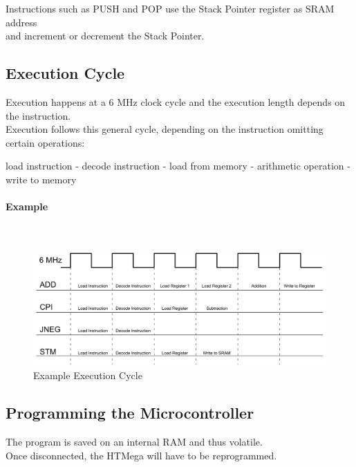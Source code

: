 Instructions such as PUSH and POP use the Stack Pointer register as SRAM address\\
and increment or decrement the Stack Pointer. \newpage


\subsection{Execution Cycle}
Execution happens at a 6 MHz clock cycle and the execution length depends on the instruction.\\
Execution follows this general cycle, depending on the instruction omitting certain operations:
\begin{center}\begin{mdframed}[backgroundcolor=light-gray, roundcorner=10pt,leftmargin=1, rightmargin=1, innerleftmargin=13, innertopmargin=15,innerbottommargin=15, outerlinewidth=1, linecolor=light-gray]
load instruction - decode instruction - load from memory - arithmetic operation - write to memory
\end{mdframed} \end{center}
\paragraph{Example}~\\
\begin{figure}[h]
    \begin{center}
        \includegraphics[scale=0.22]{assets/Execution Cycle.png}
    \end{center}
    \caption{Example Execution Cycle}
\end{figure}
\subsection{Programming the Microcontroller}
The program is saved on an internal RAM and thus volatile.\\ Once disconnected, the HTMega will have to be reprogrammed.


